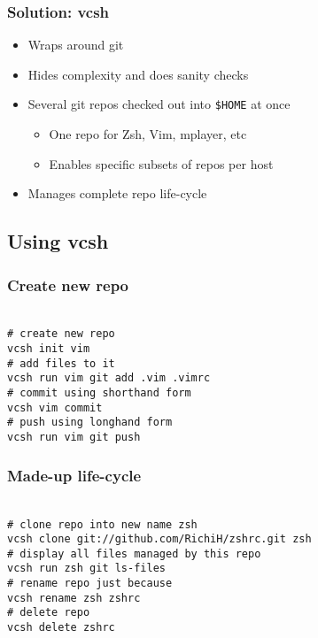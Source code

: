 \documentclass[t]{beamer}
\begin{document}
\begin{frame}
	\frametitle{Solution: vcsh}
	\begin{itemize}
		\item Wraps around git
		\item Hides complexity and does sanity checks
			\item Several git repos checked out into \texttt{\$HOME} at once
		\begin{itemize}
			\item One repo for Zsh, Vim, mplayer, etc
			\item Enables specific subsets of repos per host
		\end{itemize}
		\item Manages complete repo life-cycle
	\end{itemize}
\end{frame}

\subsection{Using vcsh}

\begin{frame}
	\frametitle{Create new repo}
	\texttt{ \\
		\# create new repo \\
		vcsh init vim \\
		\# add files to it \\
		vcsh run vim git add .vim .vimrc \\
		\# commit using shorthand form \\
		vcsh vim commit \\
		\# push using longhand form \\
		vcsh run vim git push
	}
\end{frame}

\begin{frame}
	\frametitle{Made-up life-cycle}
	\texttt{ \\
		\# clone repo into new name zsh \\
		vcsh clone git://github.com/RichiH/zshrc.git zsh \\
		\# display all files managed by this repo \\
		vcsh run zsh git ls-files \\
		\# rename repo just because \\
		vcsh rename zsh zshrc \\
		\# delete repo \\
		vcsh delete zshrc
	}
\end{frame}
\end{document}
